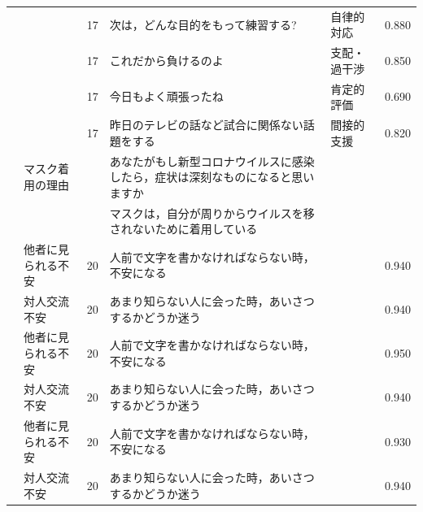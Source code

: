 \begin{landscape}
\begin{longtable}{p{2cm}p{2cm}p{2cm}p{6cm}p{2cm}p{2cm}}
                                 &                                  & 17  & 次は，どんな目的をもって練習する?                                   & 自律的対応                & 0.880   \\
                                 &                                  & 17  & これだから負けるのよ                                          & 支配・過干渉               & 0.850   \\
                                 &                                  & 17  & 今日もよく頑張ったね                                          & 肯定的評価                & 0.690   \\
                                 &                                  & 17  & 昨日のテレビの話など試合に関係ない話題をする                              & 間接的支援                & 0.820   \\
        \citet{Sakakibara202192} & マスク着用の理由                         &     & あなたがもし新型コロナウイルスに感染したら，症状は深刻なものになると思いますか             &                      &         \\
                                 &                                  &     & マスクは，自分が周りからウイルスを移されないために着用している                     &                      &         \\
        \citet{Miyazaki202192}   & 他者に見られる不安                        & 20  & 人前で文字を書かなければならない時，不安になる                             &                      & 0.940   \\
                                 & 対人交流不安                           & 20  & あまり知らない人に会った時，あいさつするかどうか迷う                          &                      & 0.940   \\
                                 & 他者に見られる不安                        & 20  & 人前で文字を書かなければならない時，不安になる                             &                      & 0.950   \\
                                 & 対人交流不安                           & 20  & あまり知らない人に会った時，あいさつするかどうか迷う                          &                      & 0.940   \\
                                 & 他者に見られる不安                        & 20  & 人前で文字を書かなければならない時，不安になる                             &                      & 0.930   \\
                                 & 対人交流不安                           & 20  & あまり知らない人に会った時，あいさつするかどうか迷う                          &                      & 0.940   \\

\end{longtable}
\end{landscape}
